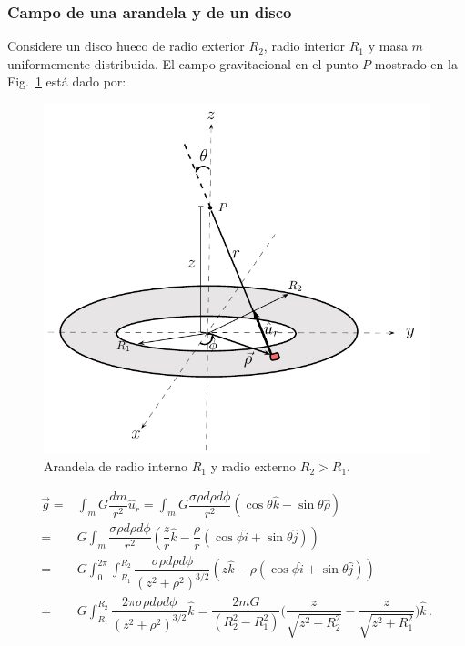 \subsubsection{Campo de una arandela y de un disco}
Considere un disco hueco de radio exterior $R_2$, radio interior $R_1$ y masa $m$ uniformemente distribuida. El campo gravitacional en el punto $P$ mostrado en la Fig.~\ref{fig:gravitacion-arandela} está dado por:
%
\begin{figure}[h]
\begin{center}
\includegraphics[scale=0.9]{gravitacion/arandela}
\end{center}
\caption{Arandela de radio interno $R_1$ y radio externo $R_2>R_1$.}
\label{fig:gravitacion-arandela}
\end{figure}
%
\begin{align}
\vec{g}=&\int_m G\dfrac{dm}{r^2}\hat{u}_r
= \int_m G\dfrac{\sigma\rho d\rho d\phi}{r^2}(\cos\theta \hat{k}-\sin\theta\hat{\rho})\nonumber\\
=& G\int_m\dfrac{\sigma\rho d\rho d\phi}{r^2}\left(\dfrac{z}{r} \hat{k}-\dfrac{\rho}{r} (\cos\phi \hat{i}+\sin\theta\hat{j})\right)
\nonumber\\
=& G\int_{0}^{2\pi}\int_{R_1}^{R_2}\dfrac{\sigma\rho d\rho d\phi}{(z^2+\rho^2)^{3/2}}\left(z \hat{k}-\rho (\cos\phi \hat{i}+\sin\theta\hat{j})\right)\nonumber\\
=& G\int_{R_1}^{R_2}\dfrac{2\pi\sigma\rho d\rho d\phi}{(z^2+\rho^2)^{3/2}} \hat{k}
=\dfrac{2mG}{(R_2^2-R_1^2)} \Bigg(\dfrac{z}{\sqrt{z^2+R_2^2} } - \dfrac{z}{\sqrt{z^2+R_1^2} }  \Bigg)\hat{k}\,.
\label{ec:campo-gravitacional-arandela}
\end{align}
